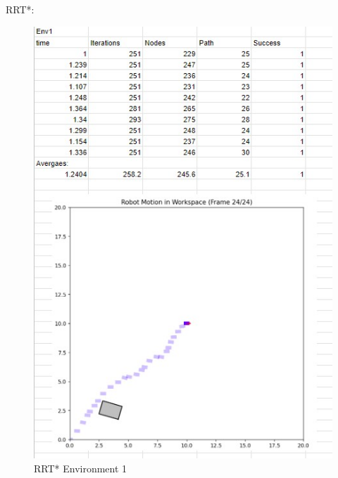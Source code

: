 \documentclass{article}
\begin{document}
    RRT*:
    \begin{figure} [H]
        \centering
        \includegraphics[width=0.5\linewidth]{latex_media/RRTStarEnv1Stats.jpg}
        \caption{RRT* Environment 1}
    \end{figure}
\end{document}
